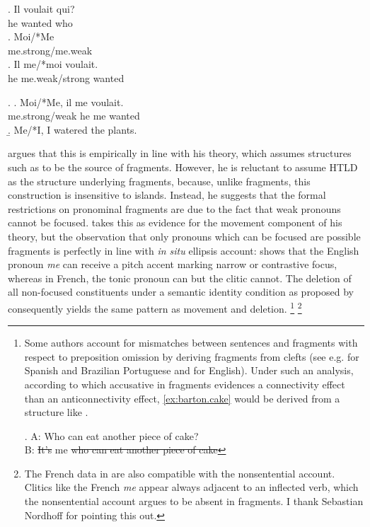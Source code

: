 \exg. Il voulait qui?\\
he wanted who\\
\hfill {}
\ag. Moi/*Me\\
me.strong/me.weak\\
\bg. Il me/*moi voulait.\\  
he me.weak/strong wanted\\

\ex. \ag. Moi/*Me, il me voulait.\\
me.strong/weak he me wanted\\
\hfill {}
\b. Me/*I, I watered the plants. \hfill \citep[703]{merchant2004}

\largerpage
\citeauthor{merchant2004} argues that this is empirically in line with his theory, which assumes structures such as \Last to be the source of fragments. However, he is reluctant to assume HTLD as the structure underlying fragments, because, unlike fragments, this construction is insensitive to islands. Instead, he suggests that the formal restrictions on pronominal fragments are due to the fact that weak pronouns cannot be focused. \citet{merchant2004} takes this as evidence for the movement component of his theory, but the observation that only pronouns which can be focused are possible fragments is perfectly in line with  \textit{in situ} ellipsis account: \Next[a] shows that the English pronoun \textit{me} can receive a pitch accent marking narrow or contrastive focus, whereas in French, the tonic pronoun \Next[b] can but the clitic \Next[c] cannot. The deletion of all non-focused constituents under a semantic identity condition as proposed by \citet{reich2007} consequently yields the same pattern as movement and deletion.%
%
\footnote{Some authors account for mismatches between sentences and fragments with respect to preposition omission by deriving fragments from clefts (see e.g. \citet{rodrigues.etal2009} for Spanish and Brazilian Portuguese and \citet{vancraenenbroeck2010} for English). Under such an analysis, according to which accusative in fragments evidences a connectivity effect than an anticonnectivity effect, \ref{ex:barton.cake} would be derived from a structure like \Next.

\ex. A: Who can eat another piece of cake?\\
     B: \sout{It's} me \sout{who can eat another piece of cake}

}\afterfn%
%
\footnote{The French data in \TextNext are also compatible with the nonsentential account. Clitics like the French \textit{me} appear always adjacent to an inflected verb, which the nonsentential account argues to be absent in fragments. I thank Sebastian Nordhoff for pointing this out.}\afterfn%

